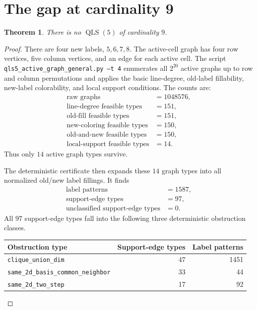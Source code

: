 \documentclass[11pt]{article}
\newtheorem{theorem}{Theorem}
\newcommand{\QLS}{\operatorname{QLS}}
\begin{document}
\section{The gap at cardinality 9}
\label{sec:c9}

\begin{theorem}
There is no \(\QLS(5)\) of cardinality \(9\).
\end{theorem}

\begin{proof}
There are four new labels, \(5,6,7,8\).  The active-cell graph has four row
vertices, five column vertices, and an edge for each active cell.  The script
\texttt{qls5\_active\_graph\_general.py --t 4} enumerates all \(2^{20}\)
active graphs up to row and column permutations and applies the basic
line-degree, old-label fillability, new-label colorability, and local support
conditions.  The counts are:
\[
\begin{array}{rl}
\text{raw graphs} &= 1048576,\\
\text{line-degree feasible types} &= 151,\\
\text{old-fill feasible types} &= 151,\\
\text{new-coloring feasible types} &= 150,\\
\text{old-and-new feasible types} &= 150,\\
\text{local-support feasible types} &= 14.
\end{array}
\]
Thus only \(14\) active graph types survive.

The deterministic certificate then expands these \(14\) graph types into all
normalized old/new label fillings.  It finds
\[
\begin{array}{rl}
\text{label patterns} &= 1587,\\
\text{support-edge types} &= 97,\\
\text{unclassified support-edge types} &= 0.
\end{array}
\]
All \(97\) support-edge types fall into the following three deterministic
obstruction classes.

\begin{center}
\begin{tabular}{lrr}
\toprule
Obstruction type & Support-edge types & Label patterns \\
\midrule
\texttt{clique\_union\_dim} & 47 & 1451 \\
\texttt{same\_2d\_basis\_common\_neighbor} & 33 & 44 \\
\texttt{same\_2d\_two\_step} & 17 & 92 \\
\bottomrule
\end{tabular}
\end{center}


\end{proof}
\end{document}
